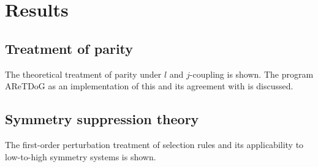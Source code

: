 \section{Results}

\subsection{Treatment of parity}
The theoretical treatment of parity under $l$ and $j$-coupling is shown. The program AReTDoG as an implementation of this and its agreement with \cite{karlsson} is discussed.

\subsection{Symmetry suppression theory} \label{sec:suppression}
The first-order perturbation treatment of selection rules and its applicability to low-to-high symmetry systems is shown.

